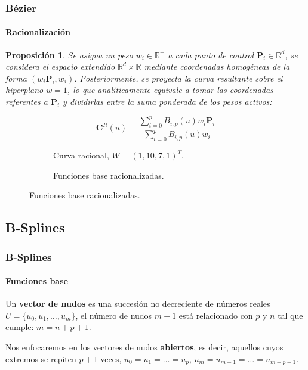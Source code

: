 \documentclass[compress]{beamer}
\newtheorem{proposition}[theorem]{Proposición}
\newcommand\R{\mathbb{R}}
\begin{document}
\begin{frame}
	\frametitle{Bézier}
	\framesubtitle{Racionalización}
	\scriptsize
	\begin{proposition}
	Se asigna un peso $w_i \in \mathbb{R}^+$ a cada punto de control $\mathbf{P}_i \in \R^d$, se considera el espacio extendido
    $\mathbb{R}^d \times \mathbb{R}$ mediante coordenadas homogéneas de la forma $(w_i \mathbf{P}_i, w_i)$.
    Posteriormente, se proyecta la curva resultante sobre el hiperplano $w=1$, lo que analíticamente equivale
    a tomar las coordenadas referentes a $\mathbf{P}_i$ y dividirlas entre la suma ponderada de los pesos activos:    
    

	\vspace{-0.3cm}

    \begin{equation*}
        \mathbf{C}^R(u) = \frac{\sum_{i=0}^{p} B_{i,p}(u) w_i \mathbf{P}_i}{\sum_{i=0}^{p} B_{i,p}(u) w_i}
    \end{equation*}
\end{proposition}
\vspace{-5pt}
\begin{figure}[H]\tiny
    \centering
    \begin{subfigure}{0.33\textwidth}
        
        \caption{Curva racional, $W=(1,10,7,1)^T$.}
    \end{subfigure}
    \begin{subfigure}{0.32\textwidth}
        
		\caption{Funciones base racionalizadas.}
    \end{subfigure}
\end{figure}

\end{frame}


\subsection{B-Splines}

\begin{frame}
	\frametitle{B-Splines}
	\framesubtitle{Funciones base} 

	\begin{definition}
		    Un \textbf{vector de nudos} es una succesión no decreciente de números reales $U = \{u_0, u_1, \ldots, u_m\}$, el número de nudos $m+1$ está relacionado con $p$ y $n$ tal que cumple: $m=n+p+1$.

		Nos enfocaremos en los vectores de nudos \textbf{abiertos}, es decir, aquellos cuyos extremos se repiten $p+1$ veces, $u_0=u_1=\dots=u_{p}$, $u_m=u_{m-1}=\dots=u_{m-p+1}$.
	\end{definition}

\end{frame}
\end{document}
